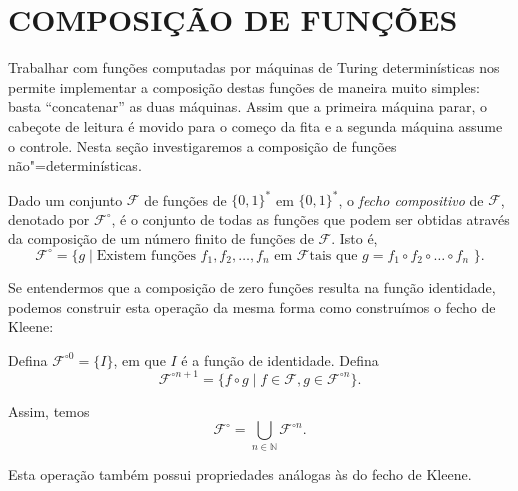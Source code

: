 \section{COMPOSIÇÃO DE FUNÇÕES}
\label{sec:function_composition}

Trabalhar com funções computadas por máquinas de Turing determinísticas
nos permite implementar a composição destas funções de maneira muito simples:
basta ``concatenar'' as duas máquinas.
Assim que a primeira máquina parar,
o cabeçote de leitura é movido para o começo da fita
e a segunda máquina assume o controle.
Nesta seção investigaremos a composição de funções não"=determinísticas.

\begin{definition}
    Dado um conjunto $\mathcal F$ de funções de $\{0, 1\}^*$ em $\{0, 1\}^*$,
    o \emph{fecho compositivo} de $\mathcal F$,
    denotado por $\mathcal F^\circ$,
    é o conjunto de todas as funções que podem ser obtidas
    através da composição de um número finito de funções de $\mathcal F$.
    Isto é,
    \begin{equation*}
        \mathcal F^\circ = \{g \mid
            \text{Existem funções $f_1, f_2, \dots, f_n$ em $\mathcal F$
                tais que $g = f_1 \circ f_2 \circ \dots \circ f_n$
            }
        \}.
    \end{equation*}
\end{definition}

Se entendermos que a composição de zero funções resulta
na função identidade,
podemos construir esta operação da mesma forma como construímos o fecho de Kleene:

Defina $\mathcal F^{\circ 0} = \{I\}$,
em que $I$ é a função de identidade.
Defina
\begin{equation*}
    \mathcal F^{\circ n+1} = \{ f \circ g \mid
        f \in \mathcal F, g \in \mathcal F^{\circ n}
    \}.
\end{equation*}

Assim, temos
\begin{equation*}
    \mathcal F^\circ = \bigcup_{n \in \mathbb N} \mathcal F^{\circ n}.
\end{equation*}

Esta operação também possui propriedades análogas às do fecho de Kleene.

